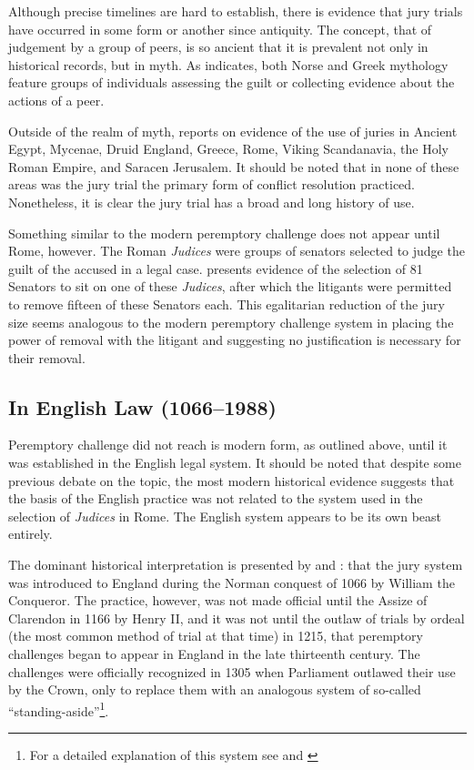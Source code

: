 Although precise timelines are hard to establish, there is evidence that jury trials have occurred in some form or another since
antiquity. The concept, that of judgement by a group of peers, is so ancient that it is prevalent not only in historical records,
but in myth. As \cite{hoffman1997} indicates, both Norse and Greek mythology feature groups of individuals assessing the guilt or
collecting evidence about the actions of a peer.

Outside of the realm of myth, \cite{hoffman1997} reports on evidence of the use of juries in Ancient Egypt, Mycenae, Druid
England, Greece, Rome, Viking Scandanavia, the Holy Roman Empire, and Saracen Jerusalem. It should be noted that in none of these
areas was the jury trial the primary form of conflict resolution practiced. Nonetheless, it is clear the jury trial has a broad
and long history of use.

Something similar to the modern peremptory challenge does not appear until Rome, however. The Roman \textit{Judices} were groups
of senators selected to judge the guilt of the accused in a legal case. \cite{hoffman1997} presents evidence of the selection of
81 Senators to sit on one of these \textit{Judices}, after which the litigants were permitted to remove fifteen of these Senators
each. This egalitarian reduction of the jury size seems analogous to the modern peremptory challenge system in placing the power
of removal with the litigant and suggesting no justification is necessary for their removal.

\subsection{In English Law (1066--1988)}

Peremptory challenge did not reach is modern form, as outlined above, until it was established in the English legal system. It
should be noted that despite some previous debate on the topic, the most modern historical evidence suggests that the basis of the
English practice was not related to the system used in the selection of \textit{Judices} in Rome. The English system appears to be
its own beast entirely.

The dominant historical interpretation is presented by \cite{vonmosch1921} and \cite{hoffman1997}: that the jury system was
introduced to England during the Norman conquest of 1066 by William the Conqueror. The practice, however, was not made official
until the Assize of Clarendon in 1166 by Henry II, and it was not until the outlaw of trials by ordeal (the most common method of
trial at that time) in 1215, that peremptory challenges began to appear in England in the late thirteenth century. The challenges
were officially recognized in 1305 when Parliament outlawed their use by the Crown, only to replace them with an analogous system
of so-called ``standing-aside''\footnote{For a detailed explanation of this system see \cite{hoffman1997} and \cite{brown2000}}. 

